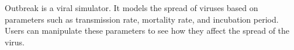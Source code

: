 \documentclass[10pt,a4paper,ragged2e,withhyper]{altacv}
\begin{document}
\begin{paracol}{2}
             Outbreak is a viral simulator. It models the spread of viruses based on parameters such as transmission rate, mortality rate, and incubation period. Users can manipulate these parameters to see how they affect the spread of the virus.
             
        
    \end{paracol}
\end{document}
